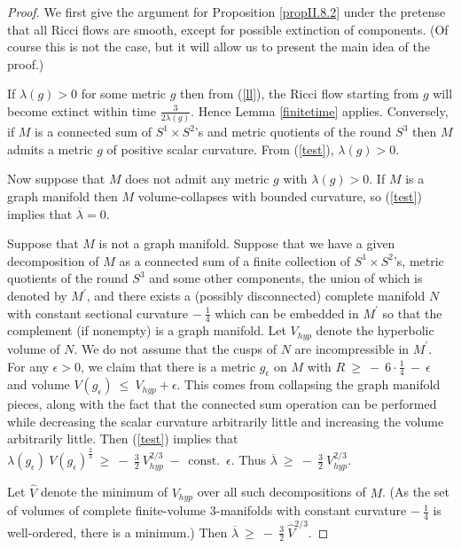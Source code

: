 \documentclass[12pt]{amsart}
\newcommand{\const}{\operatorname{const.}}
\numberwithin{equation}{section}
\theoremstyle{plain}
\theoremstyle{definition}
\theoremstyle{remark}
\begin{document}
\begin{proof}
We first give the argument for Proposition \ref{propII.8.2} under the 
pretense that all Ricci flows are smooth, except for possible
extinction of components. (Of course this is not the
case, but it will allow us to present the main idea of the proof.)

If $\lambda(g) > 0$ for some metric $g$ then from (\ref{ll}), the Ricci flow
starting from $g$ will become extinct within time
$\frac{3}{2\lambda(g)}$. Hence Lemma \ref{finitetime} applies.
Conversely, if $M$ is a connected sum of $S^1 \times S^2$'s and
metric quotients of the round $S^3$ then $M$ admits a metric $g$ of
positive scalar curvature.  From (\ref{test}), $\lambda(g) > 0$. 

Now suppose that $M$ does
not admit any metric $g$ with $\lambda(g) > 0$.
If $M$ is a graph manifold then $M$ volume-collapses with bounded
curvature, so (\ref{test}) implies that $\overline{\lambda} = 0$.

Suppose that $M$ is not a graph manifold. Suppose that we have
a given decomposition of $M$ 
as a connected sum
of a finite collection of $S^1 \times S^2$'s, metric quotients of the round
$S^3$ and some other components, the union of which is denoted by
$M^\prime$, and there exists a (possibly disconnected) complete
manifold $N$ with constant sectional curvature $- \: \frac14$ 
which can be embedded in $M^\prime$ so that the
complement (if nonempty) is a graph manifold.
Let
$V_{hyp}$ denote the hyperbolic volume of $N$.  We do not
assume that the cusps of $N$ are incompressible in $M^\prime$.
For any $\epsilon > 0$, we claim that
there is a metric $g_\epsilon$ on $M$ with 
$R \: \ge \: - \: 6 \cdot \frac14 \: - \: \epsilon$ and volume
$V(g_\epsilon) \: \le \: V_{hyp} + \epsilon$. This comes from
collapsing the graph manifold pieces, along with the
fact that the connected sum operation can be performed
while  decreasing the scalar curvature arbitrarily little and increasing
the volume arbitrarily little.
Then (\ref{test}) implies that
$\lambda(g_\epsilon) \: V(g_\epsilon)^{\frac23}
 \: \ge \: - \: \frac32 \: V_{hyp}^{2/3} \: - \: \const \: 
\epsilon$. Thus
$\overline{\lambda} \: \ge \:
- \: \frac32 \: V_{hyp}^{2/3}$.

Let $\widehat{V}$ denote the minimum of $V_{hyp}$ over
all such decompositions of $M$. (As the set of
volumes of complete finite-volume $3$-manifolds with constant curvature
$- \: \frac14$ is well-ordered, there is a minimum.)
Then
$\overline{\lambda} \: \ge \:
- \: \frac32 \: \widehat{V}^{2/3}$.


\end{proof}
\end{document}
